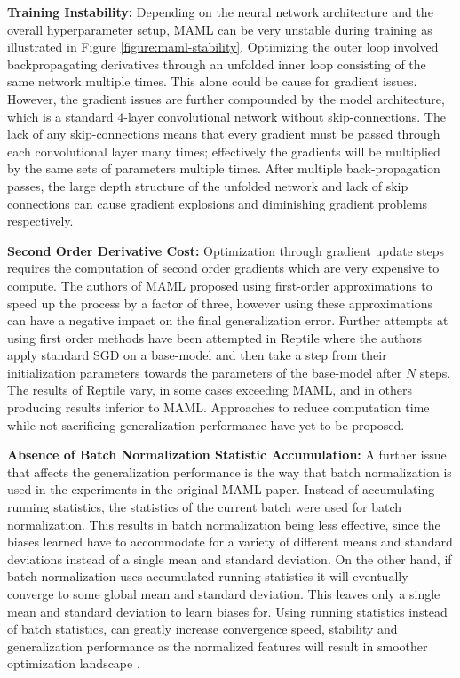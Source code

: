 \documentclass{article} \usepackage[dvipsnames]{xcolor}
\begin{document}
\textbf{Training Instability:} Depending on the neural network architecture and the overall hyperparameter setup, MAML can be very unstable during training as illustrated in Figure \ref{figure:maml-stability}. Optimizing the outer loop involved backpropagating derivatives through an unfolded inner loop consisting of the same network multiple times. This alone could be cause for gradient issues. However, the gradient issues are further compounded by the model architecture, which is a standard 4-layer convolutional network without skip-connections. The lack of any skip-connections means that every gradient must be passed through each convolutional layer many times; effectively the gradients will be multiplied by the same sets of parameters multiple times. After multiple back-propagation passes, the large depth structure of the unfolded network and lack of skip connections can cause gradient explosions and diminishing gradient problems respectively.

\textbf{Second Order Derivative Cost:} Optimization through gradient update steps requires the computation of second order gradients which are very expensive to compute. The authors of MAML proposed using first-order approximations to speed up the process by a factor of three, however using these approximations can have a negative impact on the final generalization error. Further attempts at using first order methods have been attempted in Reptile \citep{DBLP:journals/corr/abs-1803-02999} where the authors apply standard SGD on a base-model and then take a step from their initialization parameters towards the parameters of the base-model after $N$ steps. The results of Reptile vary, in some cases exceeding MAML, and in others producing results inferior to MAML. Approaches to reduce computation time while not sacrificing generalization performance have yet to be proposed.

\textbf{Absence of Batch Normalization Statistic Accumulation:} A further issue that affects the generalization performance is the way that batch normalization is used in the experiments in the original MAML paper. Instead of accumulating running statistics, the statistics of the current batch were used for batch normalization. This results in batch normalization being less effective, since the biases learned have to accommodate for a variety of different means and standard deviations instead of a single mean and standard deviation. On the other hand, if batch normalization uses accumulated running statistics it will eventually converge to some global mean and standard deviation. This leaves only a single mean and standard deviation to learn biases for. Using running statistics instead of batch statistics, can greatly increase convergence speed, stability and generalization performance as the normalized features will result in smoother optimization landscape \citep{santurkar2018does}. 
\end{document}
